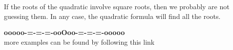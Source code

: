 \documentclass{ximera}
\begin{document}
If the roots of the quadratic involve square roots, then we probably are not guessing them.  In any case, the quadratic formula will find all the roots.






















































\begin{onlineOnly}
\begin{center}
\textbf{\textcolor{green!50!black}{ooooo-=-=-=-ooOoo-=-=-=-ooooo}} \\

more examples can be found by following this link\\ 

\end{center}
\end{onlineOnly}
\end{document}
